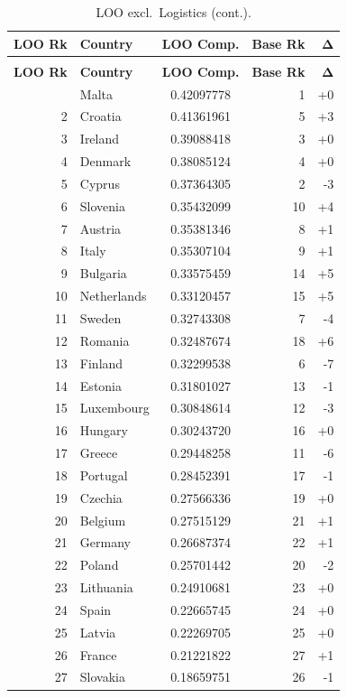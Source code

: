 \begin{longtable}{@{}rl S[table-format=1.8] r r@{}}
\caption{LOO ranking excluding Logistics.  Spearman $\rho = 0.926129$, Kendall $\tau = 0.789174$.}
\label{tab:loo-logistics}\\
\toprule
{\textbf{LOO Rk}} & {\textbf{Country}} & {\textbf{LOO Comp.}} & {\textbf{Base Rk}} & {$\boldsymbol{\Delta}$} \\
\midrule
\endfirsthead
\caption[]{LOO excl.\ Logistics (cont.).}\\
\toprule
{\textbf{LOO Rk}} & {\textbf{Country}} & {\textbf{LOO Comp.}} & {\textbf{Base Rk}} & {$\boldsymbol{\Delta}$} \\
\midrule
\endhead
\bottomrule
{} & Malta & 0.42097778 & 1 & +0 \\
  2 & Croatia & 0.41361961 & 5 & +3 \\
  3 & Ireland & 0.39088418 & 3 & +0 \\
  4 & Denmark & 0.38085124 & 4 & +0 \\
  5 & Cyprus & 0.37364305 & 2 & -3 \\
  6 & Slovenia & 0.35432099 & 10 & +4 \\
  7 & Austria & 0.35381346 & 8 & +1 \\
  8 & Italy & 0.35307104 & 9 & +1 \\
  9 & Bulgaria & 0.33575459 & 14 & +5 \\
  10 & Netherlands & 0.33120457 & 15 & +5 \\
  11 & Sweden & 0.32743308 & 7 & -4 \\
  12 & Romania & 0.32487674 & 18 & +6 \\
  13 & Finland & 0.32299538 & 6 & -7 \\
  14 & Estonia & 0.31801027 & 13 & -1 \\
  15 & Luxembourg & 0.30848614 & 12 & -3 \\
  16 & Hungary & 0.30243720 & 16 & +0 \\
  17 & Greece & 0.29448258 & 11 & -6 \\
  18 & Portugal & 0.28452391 & 17 & -1 \\
  19 & Czechia & 0.27566336 & 19 & +0 \\
  20 & Belgium & 0.27515129 & 21 & +1 \\
  21 & Germany & 0.26687374 & 22 & +1 \\
  22 & Poland & 0.25701442 & 20 & -2 \\
  23 & Lithuania & 0.24910681 & 23 & +0 \\
  24 & Spain & 0.22665745 & 24 & +0 \\
  25 & Latvia & 0.22269705 & 25 & +0 \\
  26 & France & 0.21221822 & 27 & +1 \\
  27 & Slovakia & 0.18659751 & 26 & -1 \\
\end{longtable}